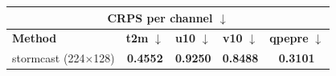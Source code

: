 \documentclass[border=10pt]{standalone}
\begin{document}
\begin{tabular}{lcccc}
\toprule
\multicolumn{5}{c}{\textbf{CRPS per channel} $\downarrow$} \\
\midrule
\textbf{Method} & \textbf{t2m} $\downarrow$ & \textbf{u10} $\downarrow$ & \textbf{v10} $\downarrow$ & \textbf{qpepre} $\downarrow$ \\
\midrule
stormcast (224$\times$128) & \textbf{0.4552} & \textbf{0.9250} & \textbf{0.8488} & \textbf{0.3101} \\
\bottomrule
\end{tabular}
\end{document}
